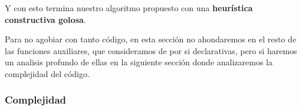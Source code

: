 Y con esto termina nuestro algoritmo propuesto con una \textbf{heurística constructiva golosa}.

Para no agobiar con tanto código, en esta sección no ahondaremos en el resto de las funciones auxiliares, que consideramos de por si declarativas, pero si haremos un analisis profundo de ellas en la siguiente sección donde analizaremos la complejidad del código.


\subsubsection{Complejidad}

